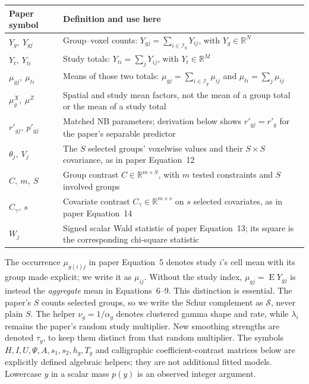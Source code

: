 \documentclass[11pt,a4paper]{article}
\newcommand{\R}{\mathbb R}
\newcommand{\E}{\operatorname{E}}
\numberwithin{equation}{section}
\begin{document}
\begin{center}\small
\begin{tabularx}{\textwidth}{lT}
\toprule
Paper symbol & Definition and use here\\
\midrule
$Y_g,\ Y_{gj}$ & Group--voxel counts:
$Y_{gj}=\sum_{i\in\mathcal I_g}Y_{ij}$, with $Y_g\in\R^N$\\
$Y_t,\ Y_{ti}$ & Study totals:
$Y_{ti}=\sum_jY_{ij}$, with $Y_t\in\R^M$\\
$\mu_{gj},\ \mu_{ti}$ & Means of those two totals:
$\mu_{gj}=\sum_{i\in\mathcal I_g}\mu_{ij}$ and
$\mu_{ti}=\sum_j\mu_{ij}$\\
$\mu_g^X,\ \mu^Z$ & Spatial and study mean factors, not the
mean of a group total or the mean of a study total\\
$r'_{gj},\ p'_{gj}$ & Matched NB parameters; derivation below shows
$r'_{gj}=r'_g$ for the paper's separable predictor\\
$\theta_j,\ V_j$ & The $S$ selected groups' voxelwise values and
their $S\times S$ covariance, as in paper Equation~12\\
$C,\ m,\ S$ & Group contrast $C\in\R^{m\times S}$, with $m$
tested constraints and $S$ involved groups\\
$C_\gamma,\ s$ & Covariate contrast $C_\gamma\in\R^{m\times s}$
on $s$ selected covariates, as in paper Equation~14\\
$W_j$ & Signed scalar Wald statistic of paper Equation~13;
its square is the corresponding chi-square statistic\\
\bottomrule
\end{tabularx}
\end{center}
The occurrence $\mu_{g(i)j}$ in paper Equation~5 denotes study $i$'s
cell mean with its group made explicit; we write it as $\mu_{ij}$.
Without the study index, $\mu_{gj}=\E Y_{gj}$ is instead the
\emph{aggregate} mean in Equations~6--9. This distinction is essential.
The paper's $S$ counts selected groups, so we write the Schur complement
as $\mathcal S$, never plain $S$.
The helper $\nu_g=1/\alpha_g$ denotes clustered gamma shape and rate,
while $\lambda_i$ remains the paper's random study multiplier.
New smoothing strengths are denoted $\tau_g$, to keep them distinct
from that random multiplier.
The symbols $H,I,U,\Psi,A,s_1,s_2,h_g,T_g$ and calligraphic
coefficient-contrast matrices below are explicitly defined algebraic
helpers; they are not additional fitted models.
Lowercase $y$ in a scalar mass $p(y)$ is an observed integer argument.
\end{document}
